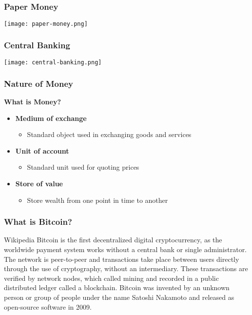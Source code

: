 \begin{frame}
    \frametitle{Paper Money}
    \texttt{[image: paper-money.png]}
\end{frame}

\begin{frame}
    \frametitle{Central Banking}
    \texttt{[image: central-banking.png]}
\end{frame}

\begin{frame}
    \frametitle{Nature of Money}
    \textbf{What is Money?}
    \begin{itemize}
        \item \textbf{Medium of exchange}
            \begin{itemize}
                \item Standard object used in exchanging goods and services
            \end{itemize}
        \item \textbf{Unit of account}
            \begin{itemize}
                \item Standard unit used for quoting prices
            \end{itemize}
        \item \textbf{Store of value}
            \begin{itemize}
                \item Store wealth from one point in time to another
            \end{itemize}
    \end{itemize}
\end{frame}

\begin{frame}
    \frametitle{What is Bitcoin?}
    \begin{block}{Wikipedia}
        Bitcoin is the first \alert{decentralized digital cryptocurrency}, as the \alert{worldwide payment system} works without a central bank or single administrator. The network is \alert{peer-to-peer} and transactions take place between users directly through the use of cryptography, without an intermediary. These \alert{transactions} are verified by network nodes, which called \alert{mining} and recorded in a \alert{public distributed ledger} called a \alert{blockchain}. Bitcoin was invented by an unknown person or group of people under the name \alert{Satoshi Nakamoto} and released as \alert{open-source software} in 2009.
    \end{block}
\end{frame}

